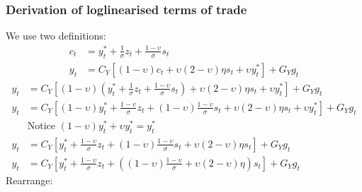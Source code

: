\subsubsection{Derivation of loglinearised terms of trade}
We use two definitions:
\begin{align} \label{eq:terms_of_trade_derivation_beginning}
    c_t & = y^*_t + \frac{1}{\sigma}z_t + \frac{1-\upsilon}{\sigma}s_t\\
    y_t &= C_Y\left[(1-\upsilon)c_t + \upsilon (2-\upsilon)\eta s_t + \upsilon y^*_t\right] + G_Y g_t
\end{align}
\begin{align} 
    y_t &= C_Y\left[(1-\upsilon)\left( y^*_t + \frac{1}{\sigma}z_t + \frac{1-\upsilon}{\sigma}s_t \right) + \upsilon (2-\upsilon)\eta s_t + \upsilon y^*_t\right] + G_Y g_t\\
    y_t &= C_Y\left[(1-\upsilon)y^*_t + \frac{1-\upsilon}{\sigma}z_t + (1-\upsilon)\frac{1-\upsilon}{\sigma}s_t + \upsilon (2-\upsilon)\eta s_t + \upsilon y^*_t\right] + G_Y g_t\\
    &\text{Notice $(1-\upsilon)y^*_t + \upsilon y^*_t = y^*_t$} \nonumber \\
    y_t &= C_Y\left[y^*_t + \frac{1-\upsilon}{\sigma}z_t + (1-\upsilon)\frac{1-\upsilon}{\sigma}s_t + \upsilon (2-\upsilon)\eta s_t\right] + G_Y g_t\\
    y_t &= C_Y\left[y^*_t + \frac{1-\upsilon}{\sigma}z_t + \left((1-\upsilon)\frac{1-\upsilon}{\sigma} + \upsilon (2-\upsilon)\eta \right) s_t\right] + G_Y g_t
\end{align} 
Rearrange:
